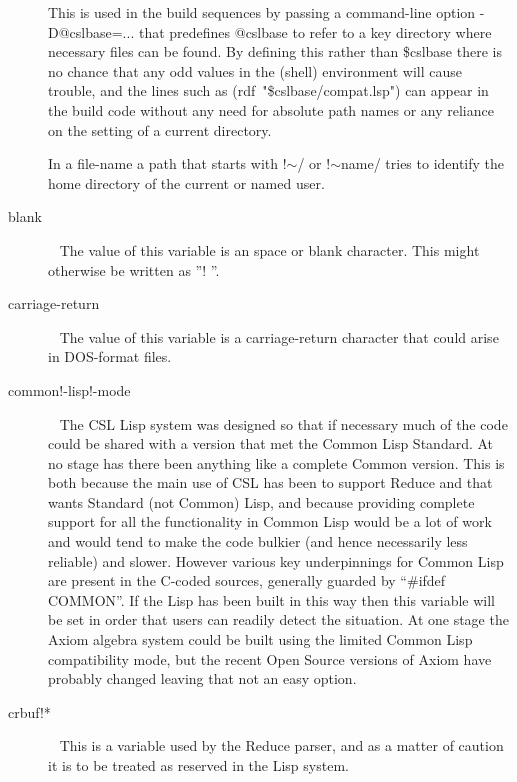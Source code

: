 \documentclass[a4paper,11pt]{article}
\begin{document}
\begin{description}
This is used in the build sequences by passing a command-line
option {\ttfamily -D@cslbase=...} that predefines
{\ttfamily @cslbase} to refer to a key directory where necessary files
can be found.
By defining this rather than {\ttfamily \$cslbase} there is no chance that
any odd values in the (shell) environment will cause trouble, and the
lines such as {\ttfamily (rdf~"\$cslbase/compat.lsp")} can appear in the build
code without any need for absolute path names or any
reliance on the setting of a current directory.
  
In a file-name a path that starts with {\ttfamily !$\sim$/} or
{\ttfamily !$\sim$name/} tries to identify the home directory of the
current or named user.

\item [{\ttfamily blank}]  ~\newline
The value of this variable is an space or blank character. This
might otherwise be written as ''{\ttfamily ! }''.

\item [{\ttfamily carriage\!-return}]  ~\newline
The value of this variable is a carriage-return character that could arise
in DOS-format files.

\item [{\ttfamily common!-lisp!-mode}]  ~\newline
The CSL Lisp system was designed so that if necessary much of the code could
be shared with a version that met the Common Lisp Standard. At no stage has
there been anything like a complete Common version. This is both because the
main use of CSL has been to support Reduce and that wants Standard (not
Common) Lisp, and because providing complete support for all the
functionality in Common Lisp would be a lot of work and would tend to make
the code bulkier (and hence necessarily less reliable) and slower. However
various key underpinnings for Common Lisp are present in the C-coded sources,
generally guarded by ``{\ttfamily \#ifdef COMMON}''. If the Lisp has been
built in this way then this variable will be set in order that users can
readily detect the situation.  At one stage the Axiom algebra system could
be built using the limited Common Lisp compatibility mode, but the recent
Open Source versions of Axiom have probably changed leaving that not an
easy option.

\item [{\ttfamily crbuf!*}]  ~\newline
This is a variable used by the Reduce parser, and as a matter of caution it
is to be treated as reserved in the Lisp system. 


\end{description}
\end{document}
